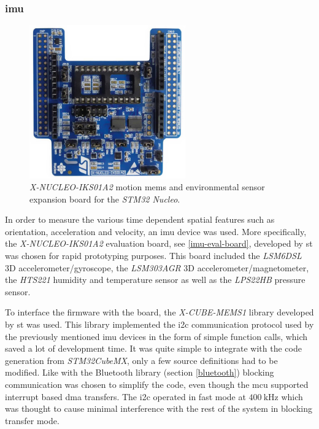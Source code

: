 \subsubsection{\gls{imu}}
\begin{figure}[H]
\centering
\includegraphics[width=0.6\textwidth]{Figures/x-nucleo-iks01a2.jpg}
\caption{\emph{X-NUCLEO-IKS01A2} motion \gls{mems} and environmental sensor expansion board for the \emph{STM32 Nucleo}.}
\label{imu-eval-board}
\end{figure}

In order to measure the various time dependent spatial features such as orientation, acceleration and velocity, an \gls{imu} device was used. More specifically, the \emph{X-NUCLEO-IKS01A2}\cite{x-nucleo-iks01a2} evaluation board, see \autoref{imu-eval-board}, developed by \gls{st} was chosen for rapid prototyping purposes. This board included the \emph{LSM6DSL} 3D accelerometer/gyroscope, the \emph{LSM303AGR} 3D accelerometer/magnetometer, the \emph{HTS221} humidity and temperature sensor as well as the \emph{LPS22HB} pressure sensor.

To interface the firmware with the board, the \emph{X-CUBE-MEMS1}\cite{x-cube-mems1} library developed by \gls{st} was used. This library implemented the \gls{i2c} communication protocol used by the previously mentioned \gls{imu} devices in the form of simple function calls, which saved a lot of development time. It was quite simple to integrate with the code generation from \emph{STM32CubeMX}, only a few source definitions had to be modified. Like with the Bluetooth library (section \ref{bluetooth}) blocking communication was chosen to simplify the code, even though the \gls{mcu} supported interrupt based \gls{dma} transfers. The \gls{i2c} operated in fast mode at $400~\textrm{kHz}$ which was thought to cause minimal interference with the rest of the system in blocking transfer mode.

